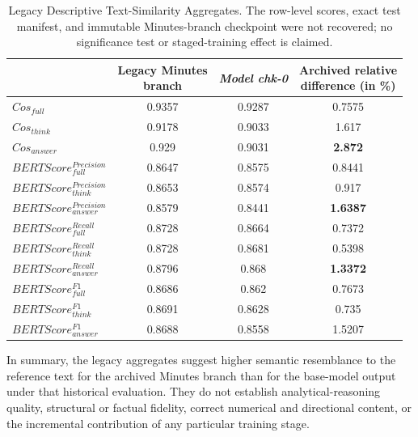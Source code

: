 \begin{table}[htp]
    \centering
    \footnotesize
    \begin{tabular}{l c c c}
        \toprule
        & \makecell[c]{Legacy Minutes\\branch}& \textit{Model chk-0}& \makecell[c]{Archived relative\\difference (in \%)}\\
        \hline
        $Cos_{full}$&0.9357&0.9287&0.7575\\ 
        $Cos_{think}$&0.9178&0.9033&1.617\\ 
        $Cos_{answer}$&0.929&0.9031&\textbf{2.872}\\ 
        \hline
        $BERTScore_{full}^{Precision}$&0.8647&0.8575&0.8441\\ 
        $BERTScore_{think}^{Precision}$&0.8653&0.8574&0.917\\ 
        $BERTScore_{answer}^{Precision}$&0.8579&0.8441&\textbf{1.6387}\\ 

        \hline
        $BERTScore_{full}^{Recall}$&0.8728&0.8664&0.7372\\ 
        $BERTScore_{think}^{Recall}$&0.8728&0.8681&0.5398\\ 
        $BERTScore_{answer}^{Recall}$&0.8796&0.868&\textbf{1.3372}\\ 

        \hline
        $BERTScore_{full}^{F1}$&0.8686&0.862&0.7673\\ 
        $BERTScore_{think}^{F1}$&0.8691&0.8628&0.735\\ 
        $BERTScore_{answer}^{F1}$&0.8688&0.8558&1.5207\\ 
        \bottomrule
    \end{tabular}
    \caption{Legacy Descriptive Text-Similarity Aggregates. The row-level scores, exact test manifest, and immutable Minutes-branch checkpoint were not recovered; no significance test or staged-training effect is claimed.}
    \label{tab:ch2:result_cos_stage2_synthetic}
\end{table}


In summary, the legacy aggregates suggest higher semantic resemblance to the reference text for the archived Minutes branch than for the base-model output under that historical evaluation. They do not establish analytical-reasoning quality, structural or factual fidelity, correct numerical and directional content, or the incremental contribution of any particular training stage.



